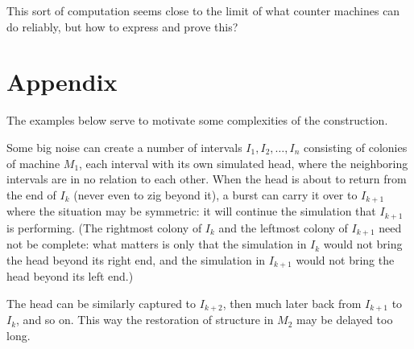 \documentclass[11pt]{memoir}
\theoremstyle{definition} %
\begin{document}
 This sort of computation seems close to the limit of what counter machines can do reliably, but
 how to express and prove this?
 



\section{Appendix}\label{sec:appendix}

The examples below serve to motivate some complexities of the construction.


\begin{example}\label{xpl:need-feather}
  Some big noise can create a number of intervals \( I_{1},I_{2},\dots,I_{n} \)
  consisting of colonies of machine \( M_{1} \), each interval with its own simulated head,
  where the neighboring intervals are in no relation to each other.
  When the head is about to return from the end of \( I_{k} \)
  (never even to zig beyond it),
  a burst can carry it over to \( I_{k+1} \) where
  the situation may be symmetric: it will continue the simulation that \( I_{k+1} \) is performing.
  (The rightmost colony of \( I_{k} \) and the leftmost colony of \( I_{k+1} \) need not be complete:
  what matters is only that the simulation in \( I_{k} \) would not bring the head beyond its right end,
  and the simulation in \( I_{k+1} \) would not bring the head beyond its left end.)

  The head can be similarly captured to \( I_{k+2} \), then much later back from \( I_{k+1} \) to \( I_{k} \),
  and so on.
  This way the restoration of structure in \( M_{2} \) may be delayed too long.
\end{example}
\end{document}
